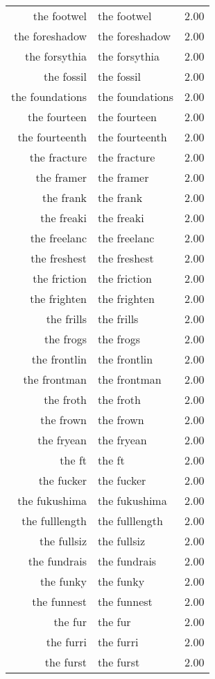 \begin{table}[ht]
\begin{tabular}{rlr}
  the footwel & the footwel & 2.00 \\ 
  the foreshadow & the foreshadow & 2.00 \\ 
  the forsythia & the forsythia & 2.00 \\ 
  the fossil & the fossil & 2.00 \\ 
  the foundations & the foundations & 2.00 \\ 
  the fourteen & the fourteen & 2.00 \\ 
  the fourteenth & the fourteenth & 2.00 \\ 
  the fracture & the fracture & 2.00 \\ 
  the framer & the framer & 2.00 \\ 
  the frank & the frank & 2.00 \\ 
  the freaki & the freaki & 2.00 \\ 
  the freelanc & the freelanc & 2.00 \\ 
  the freshest & the freshest & 2.00 \\ 
  the friction & the friction & 2.00 \\ 
  the frighten & the frighten & 2.00 \\ 
  the frills & the frills & 2.00 \\ 
  the frogs & the frogs & 2.00 \\ 
  the frontlin & the frontlin & 2.00 \\ 
  the frontman & the frontman & 2.00 \\ 
  the froth & the froth & 2.00 \\ 
  the frown & the frown & 2.00 \\ 
  the fryean & the fryean & 2.00 \\ 
  the ft & the ft & 2.00 \\ 
  the fucker & the fucker & 2.00 \\ 
  the fukushima & the fukushima & 2.00 \\ 
  the fulllength & the fulllength & 2.00 \\ 
  the fullsiz & the fullsiz & 2.00 \\ 
  the fundrais & the fundrais & 2.00 \\ 
  the funky & the funky & 2.00 \\ 
  the funnest & the funnest & 2.00 \\ 
  the fur & the fur & 2.00 \\ 
  the furri & the furri & 2.00 \\ 
  the furst & the furst & 2.00 \\ 

\end{tabular}
\end{table}
